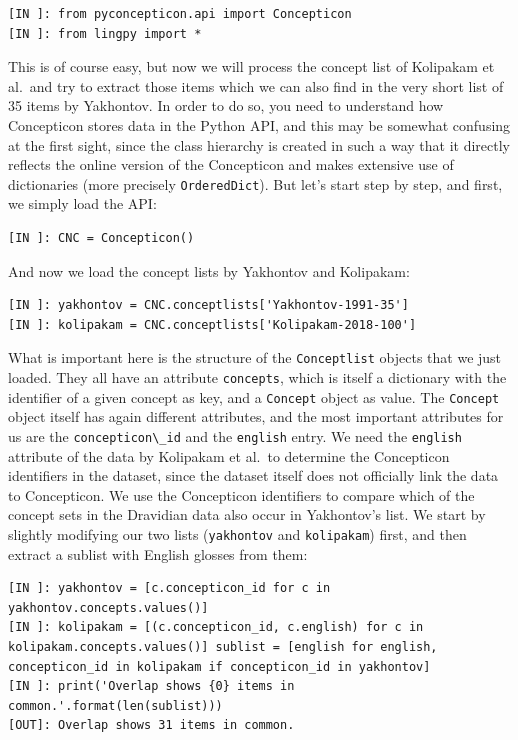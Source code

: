 \documentclass[
  english,
  a4paper,
  oneside,tablecaptionabove
]{scrbook}
\newcommand{\passthrough}[1]{#1}
\begin{document}
\begin{lstlisting}
[IN ]: from pyconcepticon.api import Concepticon
[IN ]: from lingpy import *
\end{lstlisting}

This is of course easy, but now we will process the concept list of
Kolipakam et al.~and try to extract those items which we can also find
in the very short list of 35 items by Yakhontov. In order to do so, you
need to understand how Concepticon stores data in the Python API, and
this may be somewhat confusing at the first sight, since the class
hierarchy is created in such a way that it directly reflects the online
version of the Concepticon and makes extensive use of dictionaries (more
precisely \passthrough{\lstinline!OrderedDict!}). But let's start step
by step, and first, we simply load the API:

\begin{lstlisting}
[IN ]: CNC = Concepticon()
\end{lstlisting}

And now we load the concept lists by Yakhontov and Kolipakam:

\begin{lstlisting}
[IN ]: yakhontov = CNC.conceptlists['Yakhontov-1991-35']
[IN ]: kolipakam = CNC.conceptlists['Kolipakam-2018-100']
\end{lstlisting}

What is important here is the structure of the
\passthrough{\lstinline!Conceptlist!} objects that we just loaded. They
all have an attribute \passthrough{\lstinline!concepts!}, which is
itself a dictionary with the identifier of a given concept as key, and a
\passthrough{\lstinline!Concept!} object as value. The
\passthrough{\lstinline!Concept!} object itself has again different
attributes, and the most important attributes for us are the
\passthrough{\lstinline!concepticon\_id!} and the
\passthrough{\lstinline!english!} entry. We need the
\passthrough{\lstinline!english!} attribute of the data by Kolipakam et
al.~to determine the Concepticon identifiers in the dataset, since the
dataset itself does not officially link the data to Concepticon. We use
the Concepticon identifiers to compare which of the concept sets in the
Dravidian data also occur in Yakhontov's list. We start by slightly
modifying our two lists (\passthrough{\lstinline!yakhontov!} and
\passthrough{\lstinline!kolipakam!}) first, and then extract a sublist
with English glosses from them:

\begin{lstlisting}
[IN ]: yakhontov = [c.concepticon_id for c in yakhontov.concepts.values()]
[IN ]: kolipakam = [(c.concepticon_id, c.english) for c in  kolipakam.concepts.values()] sublist = [english for english, concepticon_id in kolipakam if concepticon_id in yakhontov]
[IN ]: print('Overlap shows {0} items in common.'.format(len(sublist))) 
[OUT]: Overlap shows 31 items in common.
\end{lstlisting}
\end{document}
